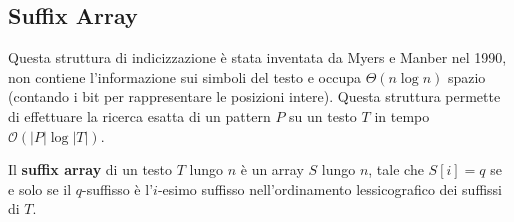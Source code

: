 \subsection{Suffix Array}
Questa struttura di indicizzazione è stata inventata da Myers e Manber nel 1990,
non contiene l'informazione sui simboli del testo e occupa $\Theta(n \log n)$ 
spazio (contando i bit per rappresentare le posizioni intere). 
Questa struttura permette di effettuare la ricerca esatta di un pattern
$P$ su  un testo $T$ in tempo $\mathcal{O}(|P| \log |T|)$.
\begin{definizione}
    Il \textbf{suffix array} di un testo $T$ lungo $n$ è un array $S$ lungo $n$,
    tale che $S[i]= q$ se e solo se il $q$-suffisso è l'$i$-esimo suffisso
    nell'ordinamento lessicografico dei suffissi di $T$.
\end{definizione}
